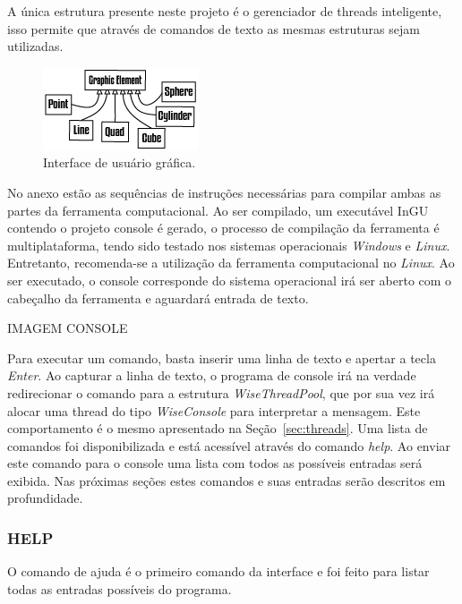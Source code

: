 \documentclass[
        english,			
        brazil			        %
        ,<...>]{abntbibufjf}
\begin{document}
A única  estrutura presente neste projeto é o gerenciador de threads inteligente, isso permite que através de comandos de texto as mesmas estruturas sejam utilizadas.


\begin{figure}[!htbp]
	\centering
	\includegraphics[scale=1]{Figures/GraphicElements}
	\caption{Interface de usuário gráfica.}
	\label{fig10:UI}
\end{figure}

No anexo estão as sequências de instruções necessárias para compilar ambas as partes da ferramenta computacional. Ao ser compilado, um executável InGU contendo o projeto console é gerado, o processo de compilação da ferramenta é multiplataforma, tendo sido testado nos sistemas operacionais \textit{Windows} e \textit{Linux}. Entretanto, recomenda-se a utilização da ferramenta computacional no \textit{Linux}. Ao ser executado, o console corresponde do sistema operacional irá ser aberto com o cabeçalho da ferramenta e aguardará entrada de texto.

IMAGEM CONSOLE

Para executar um comando, basta inserir uma linha de texto e apertar a tecla \textit{Enter}.  Ao capturar a linha de texto, o programa de console irá na verdade redirecionar o comando para a estrutura \textit{WiseThreadPool}, que por sua vez irá alocar uma thread do tipo \textit{WiseConsole} para interpretar a mensagem. Este comportamento é o mesmo apresentado na Seção~\ref{sec:threads}. Uma lista de comandos foi disponibilizada e está acessível através do comando \textit{help}. Ao enviar este comando para o console uma lista com todos as possíveis entradas será exibida. Nas próximas seções estes comandos e suas entradas serão descritos em profundidade.

\subsubsection{HELP}\label{sec:help}

O comando de ajuda é o primeiro comando da interface e foi feito para listar todas as entradas possíveis do programa.
\end{document}
